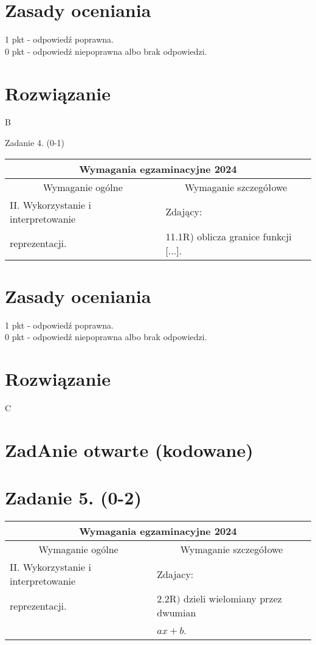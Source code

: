 \documentclass[10pt]{article}
\begin{document}
\section*{Zasady oceniania}
1 pkt - odpowiedź poprawna.\\
0 pkt - odpowiedź niepoprawna albo brak odpowiedzi.

\section*{Rozwiązanie}
B

Zadanie 4. (0-1)

\begin{center}
\begin{tabular}{|l|l|}
\hline
\multicolumn{2}{|c|}{Wymagania egzaminacyjne 2024} \\
\hline
\multicolumn{1}{|c|}{Wymaganie ogólne} & \multicolumn{1}{c|}{Wymaganie szczegółowe} \\
\hline
II. Wykorzystanie i interpretowanie & Zdający: \\
reprezentacji. & 11.1R) oblicza granice funkcji [...]. \\
\hline
\end{tabular}
\end{center}

\section*{Zasady oceniania}
1 pkt - odpowiedź poprawna.\\
0 pkt - odpowiedź niepoprawna albo brak odpowiedzi.

\section*{Rozwiązanie}
C

\section*{ZadAnie otwarte (kodowane)}
\section*{Zadanie 5. (0-2)}
\begin{center}
\begin{tabular}{|l|l|}
\hline
\multicolumn{2}{|c|}{Wymagania egzaminacyjne 2024} \\
\hline
\multicolumn{1}{|c|}{Wymaganie ogólne} & \multicolumn{1}{c|}{Wymaganie szczegółowe} \\
\hline
II. Wykorzystanie i interpretowanie & Zdajacy: \\
reprezentacji. & $2.2 \mathrm{R})$ dzieli wielomiany przez dwumian \\
 & $a x+b$. \\
\hline
\end{tabular}
\end{center}
\end{document}
